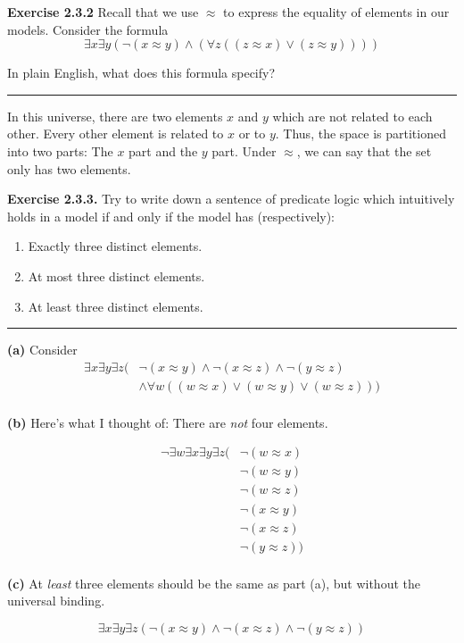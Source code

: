 \documentclass{article}
\newcommand{\Break}{\vspace{0.2cm}\hrule{}\vspace{0.2cm}}
\begin{document}
\noindent\textbf{Exercise 2.3.2} Recall that we use $\approx$ to express the
equality of elements in our models. Consider the formula
\[
  \exists x \exists y \left( \lnot (x \approx y) \wedge (\forall z ((z \approx x) \vee (z \approx y))) \right)
\]

In plain English, what does this formula specify?

\Break{}

In this universe, there are two elements $x$ and $y$ which are not related to
each other. Every other element is related to $x$ or to $y$. Thus, the space
is partitioned into two parts: The $x$ part and the $y$ part. Under $\approx$,
we can say that the set only has two elements.

\vspace{1in}

\noindent\textbf{Exercise 2.3.3.} Try to write down a sentence of predicate
logic which intuitively holds in a model if and only if the model has
(respectively):

\begin{enumerate}[label=(\alph*)]
  \item Exactly three distinct elements.
  \item At most three distinct elements.
  \item At least three distinct elements.
\end{enumerate}

\Break{}

\noindent\textbf{(a)} Consider
\begin{align*}
  \exists x \exists y \exists z (
      &\lnot (x \approx y) \wedge \lnot (x \approx z) \wedge \lnot (y \approx z) \\
      &\wedge \forall w ( (w \approx x) \vee (w \approx y) \vee (w \approx z))) \\
\end{align*}

\noindent\textbf{(b)} Here's what I thought of: There are \textit{not} four
elements.

\begin{align*}
  \lnot \exists w \exists x \exists y \exists z (
    &\lnot (w \approx x) \\
    &\lnot (w \approx y) \\
    &\lnot (w \approx z) \\
    &\lnot (x \approx y) \\
    &\lnot (x \approx z) \\
    &\lnot (y \approx z) ) \\
\end{align*}

\noindent\textbf{(c)} At \textit{least} three elements should be the same as
part (a), but without the universal binding.

\[
  \exists x \exists y \exists z (\lnot (x \approx y) \wedge \lnot (x \approx z)
  \wedge \lnot (y \approx z))
\]
\end{document}
